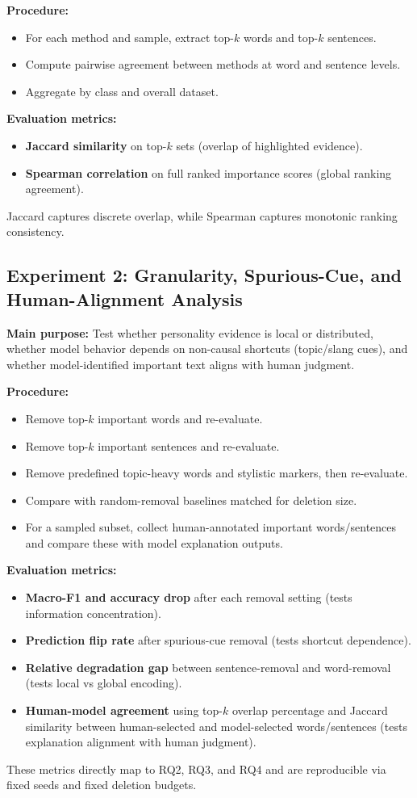\documentclass[sigplan,screen]{acmart}
\begin{document}
\textbf{Procedure:}
\begin{itemize}
    \item For each method and sample, extract top-$k$ words and top-$k$ sentences.
    \item Compute pairwise agreement between methods at word and sentence levels.
    \item Aggregate by class and overall dataset.
\end{itemize}

\textbf{Evaluation metrics:}
\begin{itemize}
    \item \textbf{Jaccard similarity} on top-$k$ sets (overlap of highlighted evidence).
    \item \textbf{Spearman correlation} on full ranked importance scores (global ranking agreement).
\end{itemize}
Jaccard captures discrete overlap, while Spearman captures monotonic ranking consistency.

\subsection{Experiment 2: Granularity, Spurious-Cue, and Human-Alignment Analysis}
\textbf{Main purpose:} Test whether personality evidence is local or distributed, whether model behavior depends on non-causal shortcuts (topic/slang cues), and whether model-identified important text aligns with human judgment.

\textbf{Procedure:}
\begin{itemize}
    \item Remove top-$k$ important words and re-evaluate.
    \item Remove top-$k$ important sentences and re-evaluate.
    \item Remove predefined topic-heavy words and stylistic markers, then re-evaluate.
    \item Compare with random-removal baselines matched for deletion size.
    \item For a sampled subset, collect human-annotated important words/sentences and compare these with model explanation outputs.
\end{itemize}

\textbf{Evaluation metrics:}
\begin{itemize}
    \item \textbf{Macro-F1 and accuracy drop} after each removal setting (tests information concentration).
    \item \textbf{Prediction flip rate} after spurious-cue removal (tests shortcut dependence).
    \item \textbf{Relative degradation gap} between sentence-removal and word-removal (tests local vs global encoding).
    \item \textbf{Human-model agreement} using top-$k$ overlap percentage and Jaccard similarity between human-selected and model-selected words/sentences (tests explanation alignment with human judgment).
\end{itemize}
These metrics directly map to RQ2, RQ3, and RQ4 and are reproducible via fixed seeds and fixed deletion budgets.

\clearpage





\appendix
\end{document}
